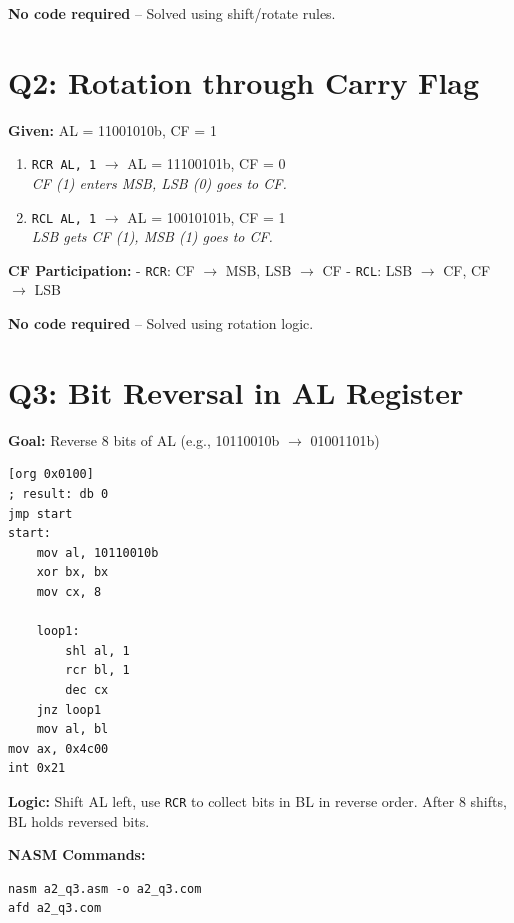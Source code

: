 \documentclass[12pt,a4paper]{article}
\begin{document}
\textbf{No code required} – Solved using shift/rotate rules.

\newpage

\section{Q2: Rotation through Carry Flag}
\textbf{Given:} AL = 11001010b, CF = 1

\begin{enumerate}[label=\alph*.]
    \item \texttt{RCR AL, 1} $\rightarrow$ AL = 11100101b, CF = 0 \\
          \textit{CF (1) enters MSB, LSB (0) goes to CF.}
    \item \texttt{RCL AL, 1} $\rightarrow$ AL = 10010101b, CF = 1 \\
          \textit{LSB gets CF (1), MSB (1) goes to CF.}
\end{enumerate}

\textbf{CF Participation:}  
- \texttt{RCR}: CF $\rightarrow$ MSB, LSB $\rightarrow$ CF  
- \texttt{RCL}: LSB $\rightarrow$ CF, CF $\rightarrow$ LSB

\textbf{No code required} – Solved using rotation logic.

\newpage

\section{Q3: Bit Reversal in AL Register}
\textbf{Goal:} Reverse 8 bits of AL (e.g., 10110010b $\rightarrow$ 01001101b)

\begin{lstlisting}[caption={a2_q3.asm}]
[org 0x0100]
; result: db 0
jmp start
start:
    mov al, 10110010b
    xor bx, bx
    mov cx, 8

    loop1:
        shl al, 1
        rcr bl, 1
        dec cx
    jnz loop1
    mov al, bl
mov ax, 0x4c00
int 0x21
\end{lstlisting}

\textbf{Logic:}  
Shift AL left, use \texttt{RCR} to collect bits in BL in reverse order. After 8 shifts, BL holds reversed bits.

\textbf{NASM Commands:}
\begin{verbatim}
nasm a2_q3.asm -o a2_q3.com
afd a2_q3.com
\end{verbatim}
\end{document}
